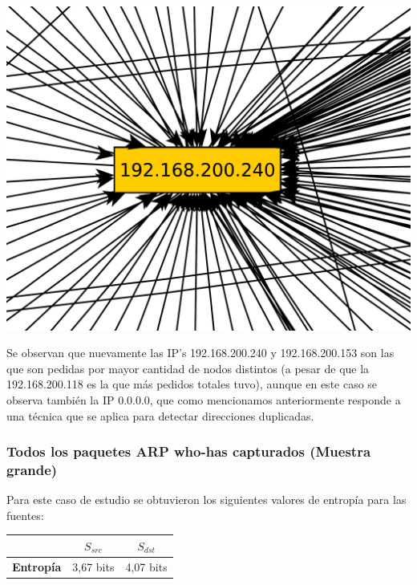 \begin{center}
\includegraphics[scale=0.3,clip=true,trim=20 0 0 0]{graphics/laburomediano254.pdf}
\end{center}

\indent Se observan que nuevamente las IP's 192.168.200.240 y 192.168.200.153 son las que son pedidas por mayor cantidad de nodos distintos (a pesar de que la 192.168.200.118 es la que más pedidos totales tuvo), aunque en este caso se observa también la IP 0.0.0.0, que como mencionamos anteriormente responde a una técnica que se aplica para detectar direcciones duplicadas.\\



\subsubsection{Todos los paquetes ARP who-has capturados (Muestra grande)}

\indent \indent Para este caso de estudio se obtuvieron los siguientes valores de entropía para las fuentes:\\

\begin{center}
	\begin{tabular}{ | c | c | c |} \hline
	   & \textbf{$S_{src}$} & \textbf{$S_{dst}$} \\ \hline
	  	\textbf{Entropía} & 3,67 bits & 4,07 bits \\ \hline
	\end{tabular}
\end{center}


